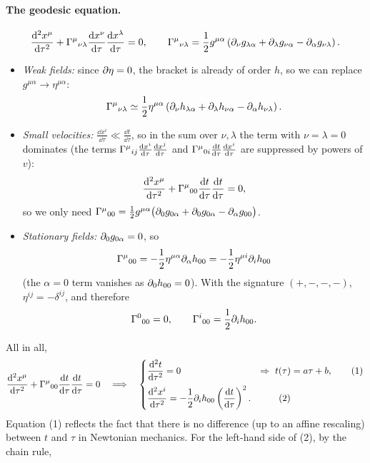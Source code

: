 \paragraph{The geodesic equation.}
\[
  \frac{\mathrm{d}^2x^\mu}{\mathrm{d}\tau^2}+\Gamma^{\mu}{}_{\nu\lambda}\frac{\mathrm{d} x^\nu}{\mathrm{d}\tau}\frac{\mathrm{d} x^\lambda}{\mathrm{d}\tau}=0,\qquad
  \Gamma^{\mu}{}_{\nu\lambda}=\frac12 g^{\mu\alpha}\left(\partial_\nu g_{\lambda\alpha}+\partial_\lambda g_{\nu\alpha}-\partial_\alpha g_{\nu\lambda}\right).
\]
\begin{itemize}
\item \emph{Weak fields:} since $\partial\eta=0$, the bracket is already of order $h$, so we can replace $g^{\mu\alpha}\to\eta^{\mu\alpha}$:
\[
  \Gamma^{\mu}{}_{\nu\lambda}\simeq\frac12\eta^{\mu\alpha}\left(\partial_\nu h_{\lambda\alpha}+\partial_\lambda h_{\nu\alpha}-\partial_\alpha h_{\nu\lambda}\right).
\]
\item \emph{Small velocities:} $\frac{\dd x^i}{\dd\tau}\ll\frac{\dd t}{\dd\tau}$, so in the sum over $\nu,\lambda$ the term with $\nu=\lambda=0$ dominates (the terms $\Gamma^{\mu}{}_{ij}\frac{\mathrm{d} x^i}{\mathrm{d}\tau}\frac{\mathrm{d} x^j}{\mathrm{d}\tau}$ and $\Gamma^{\mu}{}_{0i}\frac{\mathrm{d} t}{\mathrm{d}\tau}\frac{\mathrm{d} x^i}{\mathrm{d}\tau}$ are suppressed by powers of $v$):
\[
  \frac{\mathrm{d}^2x^\mu}{\mathrm{d}\tau^2}+\Gamma^{\mu}{}_{00}\frac{\mathrm{d} t}{\mathrm{d}\tau}\frac{\mathrm{d} t}{\mathrm{d}\tau}=0,
\]
so we only need $\Gamma^{\mu}{}_{00}=\frac12 g^{\mu\alpha}\big(\partial_0g_{0\alpha}+\partial_0g_{0\alpha}-\partial_\alpha g_{00}\big)$.
\item \emph{Stationary fields:} $\partial_0g_{0\alpha}=0$, so
\[
  \Gamma^{\mu}{}_{00}=-\frac12\eta^{\mu\alpha}\partial_\alpha h_{00}=-\frac12\eta^{\mu i}\partial_ih_{00}
\]
(the $\alpha=0$ term vanishes as $\partial_0h_{00}=0$). With the signature $(+,-,-,-)$, $\eta^{ij}=-\delta^{ij}$, and therefore
\begin{equation}
  \Gamma^{0}{}_{00}=0,\qquad\Gamma^{i}{}_{00}=\frac12\partial_ih_{00}.
\end{equation}
\end{itemize}
All in all,
\begin{equation}
  \frac{\dd^2x^\mu}{\dd\tau^2}+\Ga{\mu}{0}{0}\frac{\dd t}{\dd\tau}\frac{\dd t}{\dd\tau}=0\quad\Longrightarrow\quad
  \begin{cases}\dfrac{\dd^2t}{\dd\tau^2}=0 &\Rightarrow\ t(\tau)=a\tau+b,\qquad(1)\\[2ex]
  \dfrac{\dd^2x^i}{\dd\tau^2}=-\dfrac12\pd_ih_{00}\left(\dfrac{\dd t}{\dd\tau}\right)^2.&\qquad(2)\end{cases}
\end{equation}
Equation (1) reflects the fact that there is no difference (up to an affine rescaling) between $t$ and $\tau$ in Newtonian mechanics. For the left-hand side of (2), by the chain rule,
